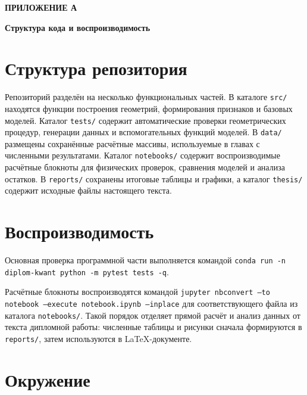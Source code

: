 \renewcommand{\thechapter}{А}
\setcounter{chapter}{1}
\setcounter{section}{0}
\clearpage
\begin{flushright}
\textbf{ПРИЛОЖЕНИЕ А}
\end{flushright}

\begin{center}
\textbf{Структура кода и воспроизводимость}
\end{center}

\vspace{0.8cm}

\section{Структура репозитория}

Репозиторий разделён на несколько функциональных частей. В каталоге \texttt{src/}
находятся функции построения геометрий, формирования признаков и базовых моделей. Каталог
\texttt{tests/} содержит автоматические проверки геометрических процедур, генерации данных
и вспомогательных функций моделей. В \texttt{data/} размещены сохранённые расчётные
массивы, используемые в главах с численными результатами. Каталог \texttt{notebooks/}
содержит воспроизводимые расчётные блокноты для физических проверок, сравнения моделей и
анализа остатков. В \texttt{reports/} сохранены итоговые таблицы и графики, а каталог
\texttt{thesis/} содержит исходные файлы настоящего текста.

\section{Воспроизводимость}

Основная проверка программной части выполняется командой \texttt{conda run -n diplom-kwant
python -m pytest tests -q}.

Расчётные блокноты воспроизводятся командой \texttt{jupyter nbconvert --to notebook
--execute notebook.ipynb --inplace} для соответствующего файла из каталога
\texttt{notebooks/}. Такой порядок отделяет прямой расчёт и анализ данных от текста
дипломной работы: численные таблицы и рисунки сначала формируются в \texttt{reports/},
затем используются в \LaTeX{}-документе.

\section{Окружение}

